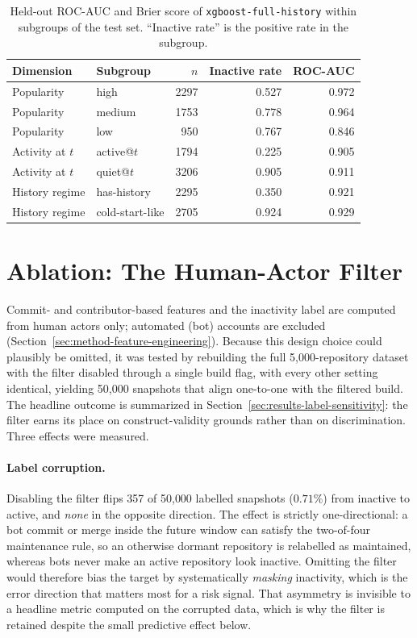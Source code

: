 \begin{table}[htbp]
  \centering
  \caption{Held-out ROC-AUC and Brier score of \texttt{xgboost-full-history}
  within subgroups of the test set. ``Inactive rate'' is the positive rate in
  the subgroup.}
  \label{tab:slice-metrics}
  \begin{tabular}{llrrr}
    \toprule
    Dimension & Subgroup & \(n\) & Inactive rate & ROC-AUC \\
    \midrule
    Popularity      & high            & 2297 & 0.527 & 0.972 \\
    Popularity      & medium          & 1753 & 0.778 & 0.964 \\
    Popularity      & low             & 950  & 0.767 & 0.846 \\
    \midrule
    Activity at \(t\) & active@\(t\)   & 1794 & 0.225 & 0.905 \\
    Activity at \(t\) & quiet@\(t\)    & 3206 & 0.905 & 0.911 \\
    \midrule
    History regime  & has-history     & 2295 & 0.350 & 0.921 \\
    History regime  & cold-start-like & 2705 & 0.924 & 0.929 \\
    \bottomrule
  \end{tabular}
\end{table}

\section{Ablation: The Human-Actor Filter}
\label{appendix:bot-ablation}

Commit- and contributor-based features and the inactivity label are computed from
human actors only; automated (bot) accounts are excluded
(Section~\ref{sec:method-feature-engineering}). Because this design choice could
plausibly be omitted, it was tested by rebuilding the full 5{,}000-repository
dataset with the filter disabled through a single build flag, with every other
setting identical, yielding 50{,}000 snapshots that align one-to-one with the
filtered build. The headline outcome is summarized in
Section~\ref{sec:results-label-sensitivity}: the filter earns its place on
construct-validity grounds rather than on discrimination. Three effects were
measured.

\paragraph{Label corruption.} Disabling the filter flips 357 of 50{,}000 labelled snapshots (\(0.71\%\)) from inactive to active, and \emph{none} in the opposite direction. The effect is strictly one-directional: a bot commit or merge inside the future window can satisfy the two-of-four maintenance rule, so an otherwise dormant repository is relabelled as maintained, whereas bots never make an active repository look inactive. Omitting the filter would therefore bias the target by systematically \emph{masking} inactivity, which is the error direction that matters most for a risk signal. That asymmetry is invisible to a headline metric computed on the corrupted data, which is why the filter is retained despite the small predictive effect below.

